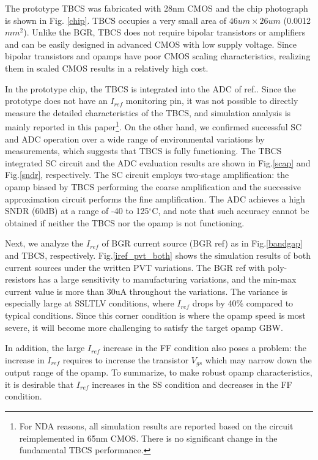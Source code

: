 \documentclass[paper]{ieice}
\begin{document}
\qquad The prototype TBCS was fabricated with 28nm CMOS and the chip photograph is shown in Fig. \ref{chip}. TBCS occupies a very small area of $46um \times 26um$ (0.0012$mm^2$). Unlike the BGR, TBCS does not require bipolar transistors or amplifiers and can be easily designed in advanced CMOS with low supply voltage. Since bipolar transistors and opamps have poor CMOS scaling characteristics, realizing them in scaled CMOS results in a relatively high cost.

In the prototype chip, the TBCS is integrated into the ADC of ref.\cite{yoshioka201728}. Since the prototype does not have an $I_{ref}$ monitoring pin, it was not possible to directly measure the detailed characteristics of the TBCS, and simulation analysis is mainly reported in this paper\footnote{For NDA reasons, all simulation results are reported based on the circuit reimplemented in 65nm CMOS. There is no significant change in the fundamental TBCS performance.}. On the other hand, we confirmed successful SC and ADC operation over a wide range of environmental variations by measurements, which suggests that TBCS is fully functioning. The TBCS integrated SC circuit and the ADC evaluation results are shown in Fig.\ref{scap} and Fig.\ref{sndr}, respectively. The SC circuit employs two-stage amplification: the opamp biased by TBCS performing the coarse amplification and the successive approximation circuit performs the fine amplification. The ADC achieves a high SNDR (60dB) at a range of -40 to 125$^\circ$C, and note that such accuracy cannot be obtained if neither the TBCS nor the opamp is not functioning. 

Next, we analyze the $I_{ref}$ of BGR current source (BGR ref) as in Fig.\ref{bandgap} and TBCS, respectively. Fig.\ref{iref_pvt_both} shows the simulation results of both current sources under the written PVT variations. The BGR ref with poly-resistors has a large sensitivity to manufacturing variations, and the min-max current value is more than 30uA throughout the variations. The variance is especially large at SSLTLV conditions, where $I_{ref}$ drops by 40\% compared to typical conditions.
Since this corner condition is where the opamp speed is most severe, it will become more challenging to satisfy the target opamp GBW. %

In addition, the large $I_{ref}$ increase in the FF condition also poses a problem: the increase in $I_{ref}$ requires to increase the transistor $V_{gs}$ which may narrow down the output range of the opamp. To summarize, to make robust opamp characteristics, it is desirable that $I_{ref}$ increases in the SS condition and decreases in the FF condition.
\end{document}
